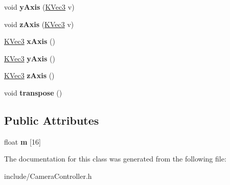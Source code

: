 \begin{DoxyCompactItemize}
\item 
\hypertarget{class_k_matrix_a3b6592d56429a1f17ba1f6c00241f3c0}{
void {\bfseries yAxis} (\hyperlink{class_k_vec3}{KVec3} v)}
\label{class_k_matrix_a3b6592d56429a1f17ba1f6c00241f3c0}

\item 
\hypertarget{class_k_matrix_aa11daa1a468d26a83df8259dfc560751}{
void {\bfseries zAxis} (\hyperlink{class_k_vec3}{KVec3} v)}
\label{class_k_matrix_aa11daa1a468d26a83df8259dfc560751}

\item 
\hypertarget{class_k_matrix_a787056c1222785b1aa0719f727fa2bb0}{
\hyperlink{class_k_vec3}{KVec3} {\bfseries xAxis} ()}
\label{class_k_matrix_a787056c1222785b1aa0719f727fa2bb0}

\item 
\hypertarget{class_k_matrix_ab141d6d8aef0392a653128a2bab878ee}{
\hyperlink{class_k_vec3}{KVec3} {\bfseries yAxis} ()}
\label{class_k_matrix_ab141d6d8aef0392a653128a2bab878ee}

\item 
\hypertarget{class_k_matrix_a7fcb9e58f131977f61d961b7ffe02cb8}{
\hyperlink{class_k_vec3}{KVec3} {\bfseries zAxis} ()}
\label{class_k_matrix_a7fcb9e58f131977f61d961b7ffe02cb8}

\item 
\hypertarget{class_k_matrix_ae977a70302a5951d8bbff34255c1ab35}{
void {\bfseries transpose} ()}
\label{class_k_matrix_ae977a70302a5951d8bbff34255c1ab35}

\end{DoxyCompactItemize}
\subsection*{Public Attributes}
\begin{DoxyCompactItemize}
\item 
\hypertarget{class_k_matrix_a5af507d52a7ff78e42becbbcd734b939}{
float {\bfseries m} \mbox{[}16\mbox{]}}
\label{class_k_matrix_a5af507d52a7ff78e42becbbcd734b939}

\end{DoxyCompactItemize}


The documentation for this class was generated from the following file:\begin{DoxyCompactItemize}
\item 
include/CameraController.h\end{DoxyCompactItemize}
